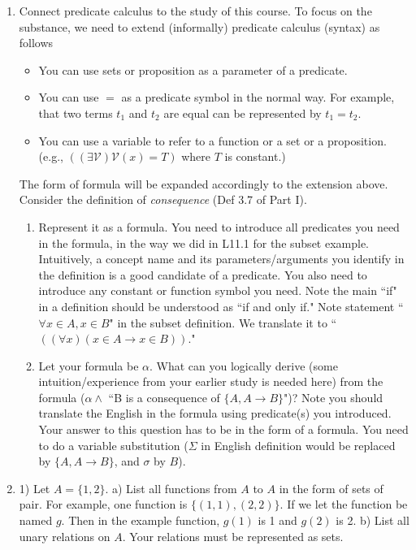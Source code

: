 \documentclass[12pt, letterpaper]{article}
\begin{document}
\begin{enumerate}
\item Connect predicate calculus to the study of this course. To focus on the substance, we need to extend (informally) predicate calculus (syntax) as follows  
  \begin{itemize} 
     \item You can use sets or proposition as a parameter of a predicate. 
     \item You can use $=$ as a predicate symbol in the normal way. For example, that two terms $t_1$ and $t_2$ are equal can be represented by $t_1 = t_2$. 
     \item You can use a variable to refer to a function or a set or a proposition. (e.g., $((\exists \mathcal{V}) \mathcal{V}(x) = T)$ where $T$ is constant.)
  \end{itemize}	
  The form of formula will be expanded accordingly to the extension above. 
  Consider the definition of {\em consequence} (Def 3.7 of Part I).  
  \begin{enumerate}
  	\item Represent it as a formula. You need to introduce all predicates you need in the formula,  in the way we did in L11.1 for the subset example. Intuitively, a concept name and its parameters/arguments you identify in the definition is a good candidate of a predicate. You also need to introduce any constant or function symbol you need.  Note the main ``if" in a definition should be understood as ``if and only if." 
  	Note statement ``$\forall x \in A, x \in B$" in the subset definition. We translate it to ``$((\forall x)(x \in A \rightarrow x \in B))$."
  	\item Let your formula be $\alpha$. What can you logically derive (some intuition/experience from your earlier study is needed here) from the formula ($\alpha \land$ ``B is a consequence of $\{A, A \rightarrow B\}$")? Note you should translate the English in the formula using predicate(s) you introduced. Your answer to this question has to be in the form of a formula. You need to do a variable substitution ($\Sigma$ in English definition would be replaced by $\{A, A \rightarrow B\}$, and $\sigma$ by $B$). 
  \end{enumerate} 
\item 
1) Let $A = \{1, 2\}$. a) List all functions from $A$ to $A$ in the form of sets of pair. For example, one function is $\{(1,1), (2,2)\}$. If we let the function be named $g$. Then in the example function, $g(1)$ is 1 and $g(2)$ is 2.  b) List all unary relations on $A$. Your relations must be represented as sets.


\end{enumerate}
\end{document}
